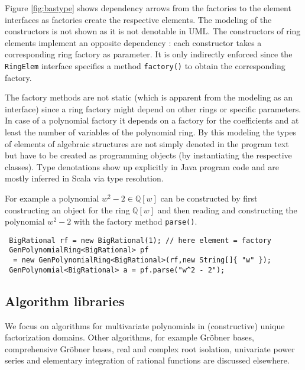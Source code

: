 \documentclass{llncs}
\newcommand{\code}[1]{\texttt{#1}}
\begin{document}
Figure \ref{fig:bastype} shows dependency arrows from the factories to
the element interfaces as factories create the respective elements.
The modeling of the constructors is not shown as it is not denotable
in UML. The constructors of ring elements implement an opposite
dependency : each constructor takes a corresponding ring
factory as parameter.  It is only indirectly enforced since the
\code{RingElem} interface specifies a method \code{factory()} to
obtain the corresponding factory.

The factory methods are not static (which is apparent from the
modeling as an interface) since a ring factory might depend on other
rings or specific parameters. In case of a polynomial factory it
depends on a factory for the coefficients and at least the number of
variables of the polynomial ring. By this modeling the types of
elements of algebraic structures are not simply denoted in the program
text but have to be created as programming objects (by instantiating
the respective classes). Type denotations show up explicitly in Java
program code and are mostly inferred in Scala via type resolution.

For example a polynomial $w^2 - 2 \in \mathbb{Q}[w]$ can be
constructed by first constructing an object for the ring
$\mathbb{Q}[w]$ and then reading and constructing the polynomial $w^2
- 2$ with the factory method \code{parse()}.
{\small
\begin{verbatim}
 BigRational rf = new BigRational(1); // here element = factory
 GenPolynomialRing<BigRational> pf 
  = new GenPolynomialRing<BigRational>(rf,new String[]{ "w" });
 GenPolynomial<BigRational> a = pf.parse("w^2 - 2");
\end{verbatim}
}


\subsection{Algorithm libraries} %

We focus on algorithms for multivariate polynomials in (constructive)
unique factorization do\-mains.  Other algorithms, for example Gr\"ob\-ner
bases, comprehensive Gr\"obner bases, real and complex root isolation,
univariate power series and elementary integration of rational
functions are discussed elsewhere. %
\end{document}
